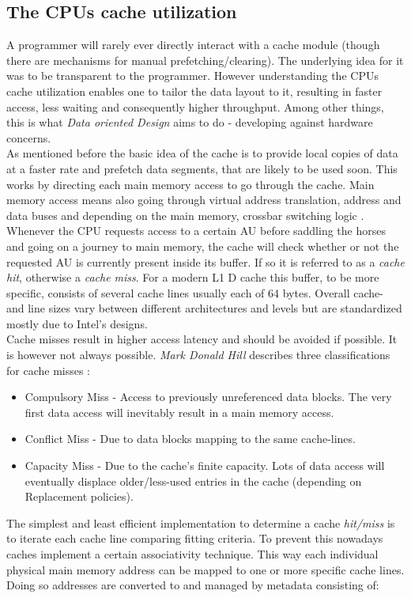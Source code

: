 \subsection{The CPUs cache utilization}\label{cpucu}
A programmer will rarely ever directly interact with a cache module (though there are mechanisms for manual prefetching/clearing). The underlying idea for it was to be transparent to the programmer. However understanding the CPUs cache utilization enables one to tailor the data layout to it, resulting in faster access, less waiting and consequently higher throughput. Among other things, this is what \textit{Data oriented Design} aims to do - developing against hardware concerns. \\
As mentioned before the basic idea of the cache is to provide local copies of data at a faster rate and prefetch data segments, that are likely to be used soon. This works by directing each main memory access to go through the cache. Main memory access means also going through virtual address translation, address and data buses and depending on the main memory, crossbar switching logic .  
Whenever the CPU requests access to a certain AU before saddling the horses and going on a journey to main memory, the cache will check whether or not the requested AU is currently present inside its buffer. If so it is referred to as a \textit{cache hit}, otherwise a \textit{cache miss}. For a modern L1 D cache this buffer, to be more specific, consists of several cache lines usually each of 64 bytes. Overall cache- and line sizes vary between different architectures and levels but are standardized mostly due to Intel's designs.\\
Cache misses result in higher access latency and should be avoided if possible. It is however not always possible. \textit{Mark Donald Hill} describes three classifications for cache misses :
\begin{itemize}
	\item Compulsory Miss - Access to previously unreferenced data blocks. The very first data access will inevitably result in a main memory access.
	\item Conflict Miss - Due to data blocks mapping to the same cache-lines.
	\item Capacity Miss - Due to the cache's finite capacity. Lots of data access will eventually displace older/less-used entries in the cache (depending on Replacement policies).
\end{itemize}
The simplest and least efficient implementation to determine a cache \textit{hit/miss} is to iterate each cache line comparing fitting criteria. To prevent this nowadays caches implement a certain associativity technique. This way each individual physical main memory address can be mapped to one or more specific cache lines. Doing so addresses are converted to and managed by metadata consisting of: 
